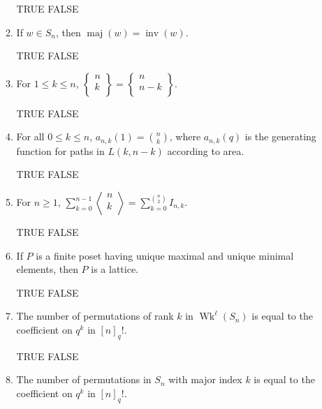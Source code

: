 \documentclass[11pt]{article}
\theoremstyle{definition}
\newcommand{\ds}{\displaystyle}
\DeclareMathOperator{\inv}{inv}
\DeclareMathOperator{\maj}{maj}
\DeclareMathOperator{\Wk}{Wk}
\newcommand{\euler}[2]{
  \displaystyle \left\langle\begin{matrix}#1  \\#2  \\ \end{matrix}\right\rangle}
\newcommand{\qbinom}[2]{
  \displaystyle \left[\begin{matrix}#1  \\#2  \\ \end{matrix}\right]}
\newcommand{\stirling}[2]{
  \displaystyle \left\{\begin{matrix}#1  \\#2  \\ \end{matrix}\right\}}
\begin{document}
\begin{enumerate}
\begin{enumerate}[label=\text{(\alph*)}]
\smallskip

TRUE \qquad FALSE

\item If $w\in S_n$, then $\maj(w)=\inv(w)$.

\smallskip

TRUE \qquad FALSE

\item For $1\leq k\leq n$, $\stirling{n}{k}=\stirling{n}{n-k}$.

\smallskip

TRUE \qquad FALSE

%
%

\item For all $0\leq k \leq n$, $\displaystyle a_{n,k}(1)=\binom{n}{k}$, where $a_{n,k}(q)$ is the generating function for paths in $L(k,n-k)$ according to area.

\smallskip

TRUE \qquad FALSE

\item For $n\geq 1$, $\ds \sum_{k=0}^{n-1}\euler{n}{k}=\sum_{k=0}^{\binom{n}{2}}I_{n,k}$.

\smallskip

TRUE \qquad FALSE

%
%

\item If $P$ is a finite poset having unique maximal and unique minimal elements, then $P$ is a lattice.

\smallskip

TRUE \qquad FALSE

\item The number of permutations of rank $k$ in $\Wk^{\ell}(S_n)$ is equal to the coefficient on $q^k$ in $[n]_q!$. %

\smallskip

TRUE \qquad FALSE

\item The number of permutations in $S_n$ with major index $k$ is equal to the coefficient on $q^k$ in $[n]_q!$. %

\smallskip


\end{enumerate}
\end{enumerate}
\end{document}
